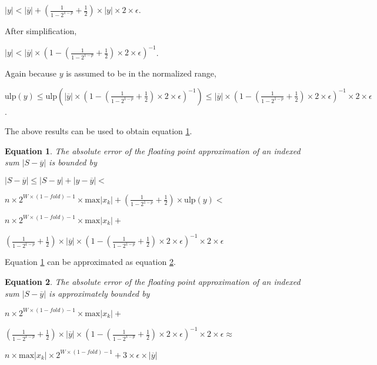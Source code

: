 \documentclass[12pt]{article}
\providecommand{\max}{\ensuremath{\text{max}}}
\providecommand{\ulp}{\ensuremath{\text{ulp}}}
\theoremstyle{plain}
\newtheorem{eq}{Equation}[section]
\begin{document}
    $|y| < |\overline{y}| + (\frac{1}{1 - 2^{1 - p}} + \frac{1}{2})\times|y|\times 2 \times \epsilon$.

    After simplification,

    $|y| < |\overline{y}|\times (1 - (\frac{1}{1 - 2^{1 - p}} + \frac{1}{2})\times 2 \times \epsilon)^{-1}$.

    Again because $y$ is assumed to be in the normalized range,

    $\ulp(y) \leq \ulp(|\overline{y}|\times (1 - (\frac{1}{1 - 2^{1 - p}} + \frac{1}{2})\times 2 \times \epsilon)^{-1}) \leq |\overline{y}|\times (1 - (\frac{1}{1 - 2^{1 - p}} + \frac{1}{2})\times 2 \times \epsilon)^{-1} \times 2 \times \epsilon$.

    The above results can be used to obtain equation \ref{eq:error2}.

    \begin{eq} The absolute error of the floating point approximation of an indexed sum $|S - \overline{y}|$ is bounded by

      $|S - \overline{y}| \leq |S - y| + |y - \overline{y}| <$

      $n \times 2^{W \times (1 - fold) - 1} \times \max|x_k| + (\frac{1}{1 - 2^{1 - p}} + \frac{1}{2})\times \ulp(y) < $

      $n \times 2^{W \times (1 - fold) - 1} \times \max|x_k| + $

      \indent \indent$(\frac{1}{1 - 2^{1 - p}} + \frac{1}{2})\times|\overline{y}|\times (1 - (\frac{1}{1 - 2^{1 - p}} + \frac{1}{2})\times 2 \times \epsilon)^{-1} \times 2 \times \epsilon$
      \label{eq:error2}
    \end{eq}

    Equation \ref{eq:error2} can be approximated as equation \ref{eq:error2approx}.

    \begin{eq} The absolute error of the floating point approximation of an indexed sum $|S - \overline{y}|$ is approximately bounded by

      $n \times 2^{W \times (1 - fold) - 1} \times \max|x_k| + $

      \indent \indent$(\frac{1}{1 - 2^{1 - p}} + \frac{1}{2})\times|\overline{y}|\times (1 - (\frac{1}{1 - 2^{1 - p}} + \frac{1}{2})\times 2 \times \epsilon)^{-1} \times 2 \times \epsilon \approx$

      $n \times \max|x_k|\times 2^{W \times (1 - fold) - 1} + 3 \times \epsilon \times |\overline{y}|$
      \label{eq:error2approx}
    \end{eq}
\end{document}
